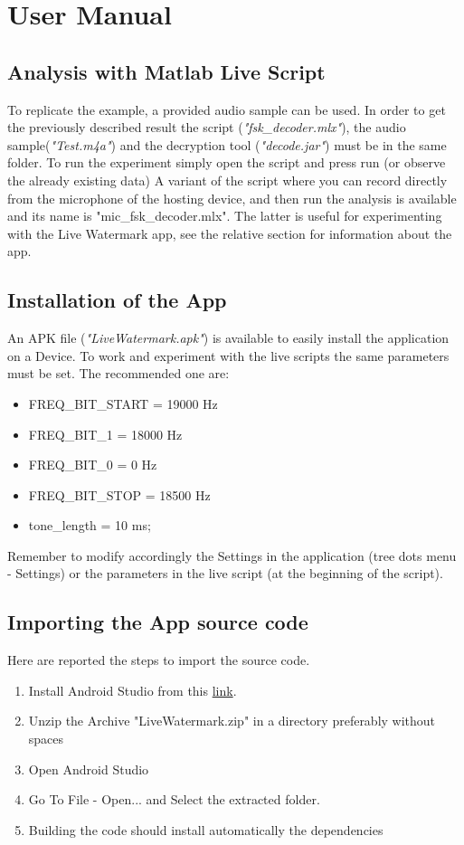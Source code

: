 \chapter{User Manual}
\label{usermanual}
\section{Analysis with Matlab Live Script}
To replicate the example, a provided audio sample can be used. In order to get the previously described result the script (\textit{"fsk\_decoder.mlx"}), the audio sample(\textit{"Test.m4a"}) and the decryption tool (\textit{"decode.jar"}) must be in the same folder. 
To run the experiment simply open the script and press run (or observe the already existing data)
A variant of the script where you can record directly from the microphone of the hosting device, and then run the analysis is available and its name is "mic\_fsk\_decoder.mlx". 
The latter is useful for experimenting with the Live Watermark app, see the relative section for information about the app.

\section{Installation of the App}
An APK file (\textit{"LiveWatermark.apk"}) is available to easily install the application on a Device. To work and experiment with the live scripts the same parameters must be set. The recommended one are:
\begin{itemize}
    \item FREQ\_BIT\_START = 19000 Hz  
    \item FREQ\_BIT\_1 = 18000 Hz 
    \item FREQ\_BIT\_0 = 0 Hz 
    \item FREQ\_BIT\_STOP = 18500 Hz  
    \item tone\_length = 10 ms; %
\end{itemize}

Remember to modify accordingly the Settings in the application (tree dots menu -\> Settings) or the parameters in the live script (at the beginning of the script).

\section{Importing the App source code}
Here are reported the steps to import the source code.
\begin{enumerate}
    \item Install Android Studio from this \href{https://developer.android.com/studio}{link}.
    \item Unzip the Archive "LiveWatermark.zip" in a directory preferably without spaces
    \item Open Android Studio
    \item Go To File -\> Open... and Select the extracted folder.
    \item Building the code should install automatically the dependencies
\end{enumerate}

